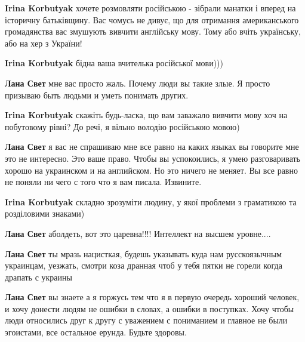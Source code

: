 \begin{itemize}
\begin{itemize}
\textbf{Irina Korbutyak} хочете розмовляти російською -
зібрали манатки і вперед на історичну батьківщину. Вас чомусь не дивує, що для
отримання американського громадянства вас змушують вивчити англійську мову.
Тому або вчіть українську, або на хер з України!

\textbf{Irina Korbutyak} бідна ваша вчителька російської мови)))

\textbf{Лана Свет} мне вас просто жаль. Почему люди вы такие злые. Я просто
призываю быть людьми и уметь понимать других.


\textbf{Irina Korbutyak} скажіть будь-ласка, що вам заважало вивчити мову хоч
на побутовому рівні? До речі, я вільно володію російською мовою)


\textbf{Лана Свет} я вас не спрашиваю мне все равно на каких языках вы говорите
мне это не интересно. Это ваше право. Чтобы вы успокоились, я умею
разговаривать хорошо на украинском и на английском. Но это ничего не меняет. Вы
все равно не поняли ни чего с того что я вам писала. Извините.

\textbf{Irina Korbutyak} складно зрозуміти людину, у якої проблеми з граматикою та розділовими знаками)

\textbf{Лана Свет} аболдеть, вот это царевна!!!! Интеллект на высшем уровне....

\textbf{Лана Свет} ты мразь нацисткая, будешь указывать куда нам русскоязычным
украинцам, уезжать, смотри коза дранная чтоб у тебя пятки не горели когда
драпать с украины

\textbf{Лана Свет} вы знаете а я горжусь тем что я в первую очередь хороший
человек, и хочу донести людям не ошибки в словах, а ошибки в поступках. Хочу
чтобы люди относились друг к другу с уважением с пониманием и главное не были
эгоистами, все остальное ерунда. Будьте здоровы.


\end{itemize}
\end{itemize}
